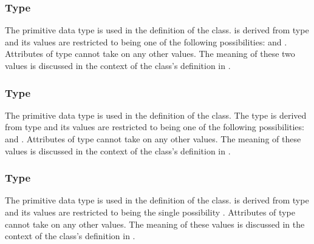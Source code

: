 \subsubsection{Type \fixttspace{}}
\label{primtype-diffusionkind}

The  primitive data type is used in the definition of the \DiffusionCoefficient class.   is derived from type  and its values are restricted to being one of the following possibilities:  and .  Attributes of type  cannot take on any other values.  The meaning of these two values is discussed in the context of the \DiffusionCoefficient class's definition in .


\subsubsection{Type \fixttspace{}}
\label{primtype-functionkind}

The  primitive data type is used in the definition of the \AnalyticVolume class.  The type  is derived from type  and its values are restricted to being one of the following possibilities:  and .  Attributes of type  cannot take on any other values.  The meaning of these values is discussed in the context of the \AnalyticVolume class's definition in .


\subsubsection{Type \fixttspace{}}
\label{primtype-geometrykind}

The  primitive data type is used in the definition of the \Geometry class.   is derived from type  and its values are restricted to being the single possibility .    Attributes of type  cannot take on any other values.  The meaning of these values is discussed in the context of the \Geometry class's definition in .


